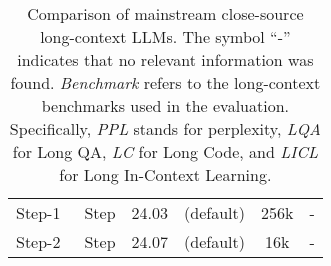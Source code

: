 \begin{table}[!ht]
{\begin{tabular}{cccccc}
     Step-1~\citeyearpar{step12024} & Step & 24.03 & (default) & 256k & - \\ 
     Step-2~\citeyearpar{step12024} & Step & 24.07 & (default) & 16k & - \\ 
     \bottomrule
    \end{tabular}
    }
    \label{table:close_source_model}
    \caption{Comparison of mainstream close-source long-context LLMs. The symbol “-” indicates that no relevant information was found. \textit{Benchmark} refers to the long-context benchmarks used in the evaluation. Specifically, \textit{PPL} stands for perplexity, \textit{LQA} for Long QA, \textit{LC} for Long Code, and \textit{LICL} for Long In-Context Learning.}
\end{table}